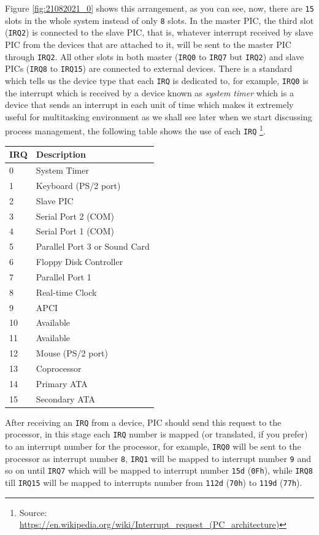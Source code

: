 Figure \ref{fig:21082021_0} shows this arrangement, as you can see, now,
there are \lstinline!15! slots in the whole system instead of only
\lstinline!8! slots. In the master PIC, the third slot
(\lstinline!IRQ2!) is connected to the slave PIC, that is, whatever
interrupt received by slave PIC from the devices that are attached to
it, will be sent to the master PIC through \lstinline!IRQ2!. All other
slots in both master (\lstinline!IRQ0! to \lstinline!IRQ7! but
\lstinline!IRQ2!) and slave PICs (\lstinline!IRQ8! to \lstinline!IRQ15!)
are connected to external devices. There is a standard which tells us
the device type that each \lstinline!IRQ! is dedicated to, for example,
\lstinline!IRQ0! is the interrupt which is received by a device known as
\emph{system timer} which is a device that sends an interrupt in each
unit of time which makes it extremely useful for multitasking
environment as we shall see later when we start discussing process
management, the following table shows the use of each \lstinline!IRQ!
\footnote{Source:
  \url{https://en.wikipedia.org/wiki/Interrupt_request_(PC_architecture)}}.

\begin{longtable}[]{@{}ll@{}}
\toprule
IRQ & Description\tabularnewline
\midrule
\endhead
0 & System Timer\tabularnewline
1 & Keyboard (PS/2 port)\tabularnewline
2 & Slave PIC\tabularnewline
3 & Serial Port 2 (COM)\tabularnewline
4 & Serial Port 1 (COM)\tabularnewline
5 & Parallel Port 3 or Sound Card\tabularnewline
6 & Floppy Disk Controller\tabularnewline
7 & Parallel Port 1\tabularnewline
8 & Real-time Clock\tabularnewline
9 & APCI\tabularnewline
10 & Available\tabularnewline
11 & Available\tabularnewline
12 & Mouse (PS/2 port)\tabularnewline
13 & Coprocessor\tabularnewline
14 & Primary ATA\tabularnewline
15 & Secondary ATA\tabularnewline
\bottomrule
\end{longtable}

After receiving an \lstinline!IRQ! from a device, PIC should send this
request to the processor, in this stage each \lstinline!IRQ! number is
mapped (or translated, if you prefer) to an interrupt number for the
processor, for example, \lstinline!IRQ0! will be sent to the processor
as interrupt number \lstinline!8!, \lstinline!IRQ1! will be mapped to
interrupt number \lstinline!9! and so on until \lstinline!IRQ7! which
will be mapped to interrupt number \lstinline!15d! (\lstinline!0Fh!),
while \lstinline!IRQ8! till \lstinline!IRQ15! will be mapped to
interrupts number from \lstinline!112d! (\lstinline!70h!) to
\lstinline!119d! (\lstinline!77h!).

